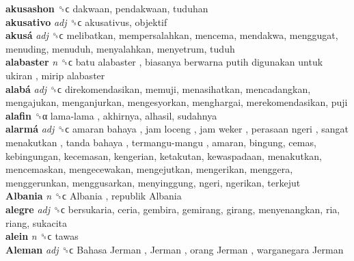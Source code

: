 \textbf{akusashon} ␝ϲ  dakwaan, pendakwaan, tuduhan  \\
\textbf{akusativo} \emph{adj}  ␝ϲ  akusativus, objektif  \\
\textbf{akusá} \emph{adj}  ␝ϲ  melibatkan, mempersalahkan, mencema, mendakwa, menggugat, menuding, menuduh, menyalahkan, menyetrum, tuduh  \\
\textbf{alabaster} \emph{n}  ␝ϲ   batu alabaster ,  biasanya berwarna putih digunakan untuk ukiran ,  mirip alabaster   \\
\textbf{alabá} \emph{adj}  ␝ϲ  direkomendasikan, memuji, menasihatkan, mencadangkan, mengajukan, menganjurkan, mengesyorkan, menghargai, merekomendasikan, puji  \\
\textbf{alafin} ␝α   lama-lama , akhirnya, alhasil, sudahnya  \\
\textbf{alarmá} \emph{adj}  ␝ϲ   amaran bahaya ,  jam loceng ,  jam weker ,  perasaan ngeri ,  sangat menakutkan ,  tanda bahaya ,  termangu-mangu , amaran, bingung, cemas, kebingungan, kecemasan, kengerian, ketakutan, kewaspadaan, menakutkan, mencemaskan, mengecewakan, mengejutkan, mengerikan, menggera, menggerunkan, menggusarkan, menyinggung, ngeri, ngerikan, terkejut  \\
\textbf{Albania} \emph{n}  ␝ϲ   Albania ,  republik Albania   \\
\textbf{alegre} \emph{adj}  ␝ϲ  bersukaria, ceria, gembira, gemirang, girang, menyenangkan, ria, riang, sukacita  \\
\textbf{alein} \emph{n}  ␝ϲ  tawas  \\
\textbf{Aleman} \emph{adj}  ␝ϲ   Bahasa Jerman ,  Jerman ,  orang Jerman ,  warganegara Jerman   \\
